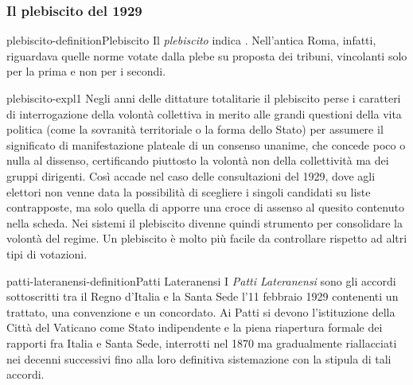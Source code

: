 \documentclass[preview]{standalone}
\begin{document}


\subsubsection{Il plebiscito del 1929}

\begin{snippetdefinition}{plebiscito-definition}{Plebiscito}
    Il \textit{plebiscito} indica .
    Nell'antica Roma, infatti, riguardava quelle
    norme votate dalla plebe su proposta dei tribuni, vincolanti solo per la prima e non per i
    secondi.
\end{snippetdefinition}

\begin{snippet}{plebiscito-expl1}
    Negli anni delle dittature totalitarie il plebiscito perse i caratteri di interrogazione della
    volontà collettiva in merito alle grandi questioni della vita politica (come la sovranità
    territoriale o la forma dello Stato) per assumere il significato di manifestazione plateale di
    un consenso unanime, che concede poco o nulla al dissenso, certificando piuttosto la volontà
    non della collettività ma dei gruppi dirigenti. Così accade nel caso delle consultazioni del
    1929, dove agli elettori non venne data la possibilità di scegliere i singoli candidati su liste
    contrapposte, ma solo quella di apporre una croce di assenso al quesito contenuto nella
    scheda.
    Nei sistemi il plebiscito divenne quindi strumento per consolidare la volontà del regime.
    Un plebiscito è molto più facile da controllare rispetto ad altri tipi di votazioni.
\end{snippet}


\begin{snippetdefinition}{patti-lateranensi-definition}{Patti Lateranensi}
    I \textit{Patti Lateranensi} sono gli accordi sottoscritti tra
    il Regno d'Italia e la Santa Sede l'11 febbraio 1929
    contenenti un trattato, una convenzione e un concordato.
    Ai Patti si devono l'istituzione della Città del Vaticano
    come Stato indipendente e la piena riapertura formale dei
    rapporti fra Italia e Santa Sede, interrotti nel 1870 ma
    gradualmente riallacciati nei decenni successivi fino alla loro
    definitiva sistemazione con la stipula di tali accordi.
\end{snippetdefinition}
\end{document}
